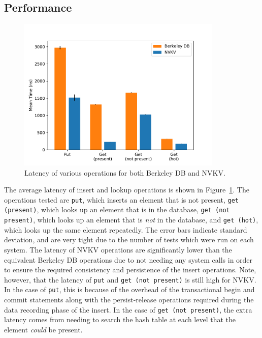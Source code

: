 \subsection{Performance}

\begin{figure}
\centering
\hspace*{-0.5in}
\includegraphics[width=98mm]{fig/perf}
\caption{Latency of various operations for both Berkeley DB and NVKV.}
\label{fig:perf}
\end{figure}

The average latency of insert and lookup operations is shown in
Figure~\ref{fig:perf}. The operations tested are \texttt{put}, which inserts an
element that is not present, \texttt{get (present)}, which
looks up an element that is in the database, \texttt{get (not present)}, which
looks up an element that is \textit{not} in the database, and \texttt{get
(hot)}, which looks up the same element repeatedly. The error bars indicate
standard deviation, and are very tight due to the number of tests which were run
on each system. The latency of NVKV operations are significantly lower than the
equivalent Berkeley DB operations due to not needing any system calls in order
to ensure the required consistency and persistence of the insert operations.
Note, however, that the latency of \texttt{put} and \texttt{get (not present)}
is still high for NVKV. In the case of \texttt{put}, this is because of the
overhead of the transactional begin and commit statements along with the
persist-release operations required during the data recording phase of the
insert. In the case of \texttt{get (not present)}, the extra latency comes from
needing to search the hash table at each level that the element \textit{could}
be present.







